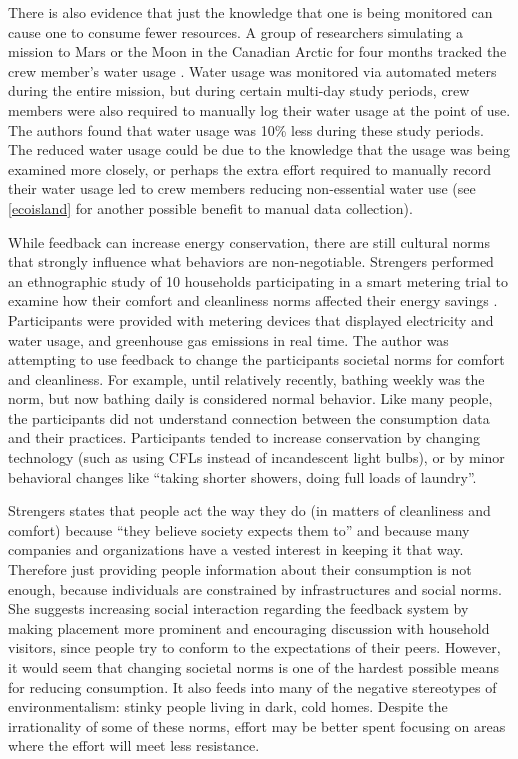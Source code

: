 There is also evidence that just the knowledge that one is being monitored can cause one to consume fewer resources. A group of researchers simulating a mission to Mars or the Moon in the Canadian Arctic for four months tracked the crew member's water usage \cite{Bamsey2008FMARS}. Water usage was monitored via automated meters during the entire mission, but during certain multi-day study periods, crew members were also required to manually log their water usage at the point of use. The authors found that water usage was 10\% less during these study periods. The reduced water usage could be due to the knowledge that the usage was being examined more closely, or perhaps the extra effort required to manually record their water usage led to crew members reducing non-essential water use (see \autoref{ecoisland} for another possible benefit to manual data collection).

While feedback can increase energy conservation, there are still cultural norms that strongly influence what behaviors are non-negotiable. Strengers performed an ethnographic study of 10 households participating in a smart metering trial to examine how their comfort and cleanliness norms affected their energy savings \cite{strengers-comfort-norms-2008}. Participants were provided with metering devices that displayed electricity and water usage, and greenhouse gas emissions in real time. The author was attempting to use feedback to change the participants societal norms for comfort and cleanliness. For example, until relatively recently, bathing weekly was the norm, but now bathing daily is considered normal behavior. Like many people, the participants did not understand connection between the consumption data and their practices. Participants tended to increase conservation by changing technology (such as using CFLs instead of incandescent light bulbs), or by minor behavioral changes like ``taking shorter showers, doing full loads of laundry''.

Strengers states that people act the way they do (in matters of cleanliness and comfort) because ``they believe society expects them to'' and because many companies and organizations have a vested interest in keeping it that way. Therefore just providing people information about their consumption is not enough, because individuals are constrained by infrastructures and social norms. She suggests increasing social interaction regarding the feedback system by making placement more prominent and encouraging discussion with household visitors, since people try to conform to the expectations of their peers.
However, it would seem that changing societal norms is one of the hardest possible means for reducing consumption. It also feeds into many of the negative stereotypes of environmentalism: stinky people living in dark, cold homes. Despite the irrationality of some of these norms, effort may be better spent focusing on areas where the effort will meet less resistance.

